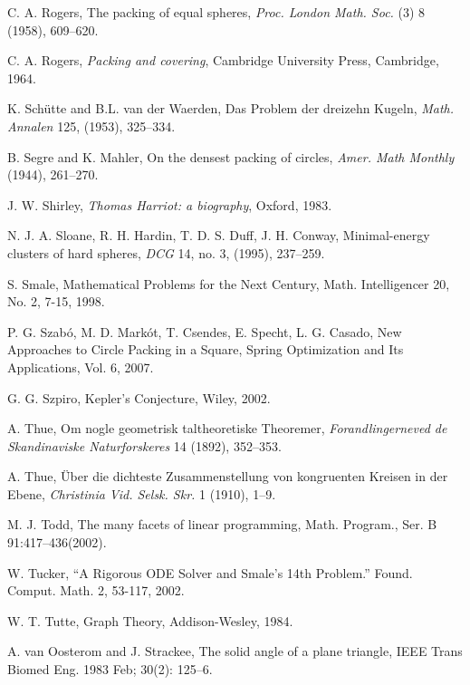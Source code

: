 \begin{thebibliography}{CHMS94}
 C. A. Rogers, The packing of equal spheres, {\it Proc. London Math.
    Soc.} (3) 8 (1958), 609--620.

 C. A. Rogers, {\it Packing and covering}, Cambridge University Press,
    Cambridge, 1964.

 K. Sch\"utte and B.L. van der Waerden, Das
Problem der dreizehn Kugeln, {\it Math. Annalen} 125, (1953),
325--334.

 B. Segre and K. Mahler, On the densest packing of
    circles, {\it Amer. Math Monthly} (1944), 261--270.

 J. W. Shirley,
{\it Thomas Harriot: a biography}, Oxford, 1983.

 N. J. A. Sloane, R. H. Hardin, T. D. S. Duff, J. H. Conway,
    Minimal-energy clusters of hard spheres,
    {\it DCG} 14,  no. 3, (1995), 237--259.

 S. Smale, 
   Mathematical Problems for the Next Century, Math. Intelligencer 20, No. 2, 7-15, 1998.
   
 P. G. Szab\'o, M. D. Mark\'ot, T. Csendes,
E. Specht, L. G. Casado, New Approaches to Circle Packing in a Square,
Spring Optimization and Its Applications, Vol. 6, 2007.

 G. G. Szpiro, Kepler's Conjecture, Wiley, 2002.

 A. Thue, Om nogle geometrisk taltheoretiske Theoremer,
    {\it Forandlingerneved de Skandinaviske Naturforskeres} 14 (1892), 352--353.

 A. Thue, \"Uber die dichteste Zusammenstellung von
    kongruenten Kreisen in der Ebene, {\it Christinia Vid. Selsk. Skr.} 1
    (1910), 1--9.

 M. J. Todd, The many facets of linear programming,
Math. Program., Ser. B 91:417--436(2002). 

  W. Tucker, ``A Rigorous ODE Solver and Smale's 14th Problem.'' 
   Found. Comput. Math. 2, 53-117, 2002.

 W. T. Tutte, Graph Theory, Addison-Wesley, 1984.

 A. van Oosterom and J. Strackee, The solid
angle of a plane triangle, IEEE Trans Biomed Eng. 1983 Feb; 30(2):
125--6.


\end{thebibliography}
